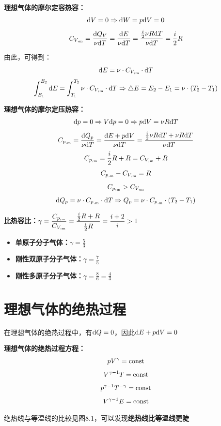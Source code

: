 \documentclass[12pt, a4paper, twoside]{ctexbook}
\begin{document}
\textbf{理想气体的摩尔定容热容：}
$$
{\rm d}V=0\Rightarrow {\rm d}W=p{\rm d}V=0
$$
$$
C_{V,_{\rm m}}=\frac{{\rm d}Q_V}{\nu {\rm d}T}=\frac{{\rm d}E}{\nu {\rm d}T}=\frac{\frac{i}{2}\nu R{\rm d}T}{\nu {\rm d}T}=\frac{i}{2}R
$$

由此，可得到：
$$
{\rm d}E=\nu \cdot C_{V,_{\rm m}}\cdot{\rm d}T
$$
$$
\int_{E_1}^{E_2}{\rm d}E=\int_{T_1}^{T_2}{\nu \cdot C_{V,_{\rm m}}\cdot{\rm d}T}\Rightarrow \bigtriangleup E=E_2-E_1=\nu \cdot(T_2-T_1)
$$

\textbf{理想气体的摩尔定压热容：}
$$
{\rm d}p=0\Rightarrow V{\rm d}p=0\Rightarrow p{\rm d}V=\nu R{\rm d}T
$$
$$
C_{p,_{\rm m}}=\frac{{\rm d}Q_p}{\nu {\rm d}T}=\frac{{\rm d}E+p{\rm d}V}{\nu {\rm d}T}=\frac{\frac{i}{2}\nu R{\rm d}T+\nu R{\rm d}T}{\nu {\rm d}T}
$$
$$
C_{p,_{\rm m}}=\frac{i}{2}R+R=C_{V,_{\rm m}}+R
$$
$$
C_{p,_{\rm m}}-C_{V,_{\rm m}}=R 
$$
$$
C_{p,_{\rm m}}>C_{V,_{\rm m}}
$$
$$
{\rm d}Q_p=\nu \cdot C_{p,_{\rm m}}\cdot {\rm d}T\Rightarrow Q_p=\nu \cdot C_{p,_{\rm m}}\cdot(T_2-T_1)
$$

\textbf{比热容比：}$\gamma=\displaystyle\frac{C_{p,_{\rm m}}}{C_{V,_{\rm m}}}=\frac{\frac{i}{2}R+R}{\frac{i}{2}R}=\frac{i+2}{i}>1$

\begin{itemize}
    \item \textbf{单原子分子气体：}$\gamma=\displaystyle \frac{5}{3}$
    
    \item \textbf{刚性双原子分子气体：}$\gamma=\displaystyle \frac{7}{5}$
    
    \item \textbf{刚性多原子分子气体：}$\gamma=\displaystyle \frac{8}{6}=\frac{4}{3}$
\end{itemize}

\section{理想气体的绝热过程}
在理想气体的绝热过程中，有${\rm d}Q=0$，因此${\rm d}E+p{\rm d}V=0$

\textbf{理想气体的绝热过程方程：}
$$
pV^{\gamma}={\rm const}
$$
$$
V^{\gamma -1}T={\rm const}
$$
$$
p^{\gamma -1}T^{-\gamma}={\rm const}
$$
$$
V^{\gamma -1}E={\rm const}
$$

绝热线与等温线的比较见图8.1，可以发现\textbf{绝热线比等温线更陡}
\end{document}
